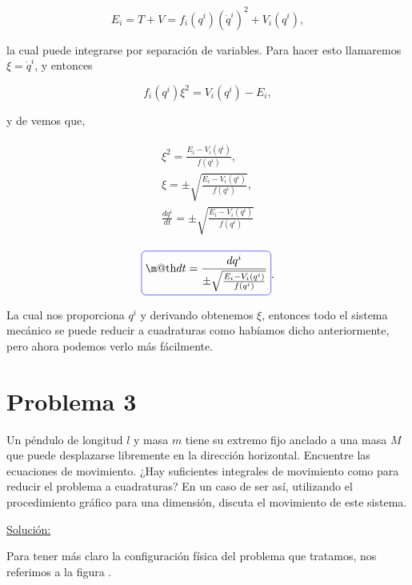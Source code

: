 \documentclass[a4paper,10pt]{article}
\makeatletter
\numberwithin{equation}{section}
\newcommand*{\boxcolor}{blue}
\renewcommand{\boxed}[1]{\textcolor{\boxcolor}{%
\tikz[baseline={([yshift=-1ex]current bounding box.center)}] \node [rectangle, minimum width=1ex,rounded corners,draw] {\normalcolor\m@th$\displaystyle#1$};}}
\makeatother
\begin{document}
\begin{equation}
 E_i = T + V = f_i(q^i)(\dot{q}^i)^2 + V_i(q^i),
 \label{eq:3energtotal1}
\end{equation}

la cual puede integrarse por separación de variables. Para hacer esto llamaremos 
$\xi = \dot{q}^i$, y entonces 

\begin{equation}
 f_i(q^i) \xi^2 = V_i(q^i) - E_i,
 \label{eq:3diferencial}
\end{equation}

y de  vemos que,

\begin{align}
 \begin{split}
  \xi^2 = \frac{E_i - V_i(q^i)}{f(q^i)}, \\
  \xi = \pm \sqrt{\frac{E_i - V_i(q^i)}{f(q^i)}}, \\
  \frac{dq^i}{dt} = \pm \sqrt{\frac{E_i - V_i(q^i)}{f(q^i)}}
 \end{split}
\end{align}

\begin{equation}
 \boxed{dt = \frac{dq^i}{\pm \sqrt{\frac{E_i - V_i(q^i)}{f(q^i)}}}}.
 \label{eq:3final}
\end{equation}

La cual nos proporciona $q^i$ y derivando obtenemos $\xi$, entonces todo el sistema 
mecánico se puede reducir a cuadraturas como habíamos dicho anteriormente, pero ahora 
podemos verlo más fácilmente.

\section{Problema 3}

Un péndulo de longitud $l$ y masa $m$ tiene su extremo fijo anclado a una masa $M$ que 
puede desplazarse libremente en la dirección horizontal. Encuentre las ecuaciones de 
movimiento. ¿Hay suficientes integrales de movimiento como para reducir el problema 
a cuadraturas? En un caso de ser así, utilizando el procedimiento gráfico para una 
dimensión, discuta el movimiento de este sistema.

\vspace{.3cm}

\underline{Solución:} \vspace{.3cm}

Para tener más claro la configuración física del problema que tratamos, nos referimos 
a la figura .
\end{document}
